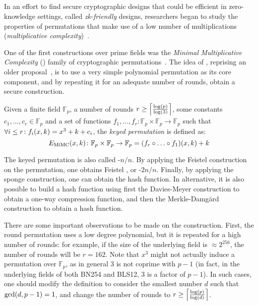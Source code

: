 \subsection{\Mimc}
In an effort to find secure cryptographic designs that could be efficient in zero-knowledge 
settings, called \emph{zk-friendly} designs, researchers began to study the properties of 
permutations that make use of a low number of multiplications 
(\emph{multiplicative complexity})~\cite{AlbrechtRSTZ2016}.

One of the first constructions over prime fields was the \emph{Minimal Multiplicative Complexity}
(\Mimc) family of cryptographic permutations~\cite{AlbrechtGRRT2016}.
The idea of \Mimc{}, reprising an older proposal~\cite{NybergK1995}, is to use a very simple 
polynomial permutation as its core component, and by repeating it for an adequate number of rounds,
obtain a secure construction.
\begin{definition}
  Given a finite field \(\mathbb{F}_p\), a number of rounds 
  \(r \ge \Ceil*{\frac{\call{\log}{p}}{\call{\log}{3}}}\), some constants 
  \(c_1, \dots, c_r \in \mathbb{F}_p\) and a set of functions 
  \(f_1, \dots, f_r\colon \mathbb{F}_p \times \mathbb{F}_p \to \mathbb{F}_p\) such that 
  \(\forall i \le r\colon \call{f_i}{x, k} = x^3 + k + c_i\), the \emph{\Mimc{} keyed permutation}
  is defined as:
  \[
    \call{E_{\Mimc}}{x, k}\colon \mathbb{F}_p \times \mathbb{F}_p \to \mathbb{F}_p = 
    \call{\Parens*{f_r \compose \dots \compose f_1}}{x, k} + k
  \]
\end{definition}

The \Mimc{} keyed permutation is also called \Mimc-\(n/n\). 
By applying the Feistel construction on the \Mimc{} permutation, one obtains Feistel \Mimc, 
or \Mimc-\(2n/n\).
Finally, by applying the sponge construction, one can obtain the \Mimchash{} hash function.
In alternative, it is also possible to build a hash function using first the Davies-Meyer 
construction to obtain a one-way compression function, and then the Merkle-Damg\"{a}rd construction
to obtain a hash function.

There are some important observations to be made on the \Mimc{} construction.
First, the round permutation uses a low degree polynomial, but it is repeated for a high number of 
rounds: for example, if the size of the underlying field is \(\approx 2^{256}\), the number of 
rounds will be \(r = 162\). 
Note that \(x^3\) might not actually induce a permutation over \(\mathbb{F}_p\), as in general 
\(3\) is not coprime with \(p - 1\) (in fact, in the underlying fields of both BN254 
and BLS12, \(3\) is a factor of \(p - 1\)).
In such cases, one should modify the definition to consider the smallest number \(d\) such 
that \(\call{\gcd}{d, p - 1} = 1\), and change the number of rounds to
\(r \ge\Ceil*{\frac{\call{\log}{p}}{\call{\log}{d}}}\).

